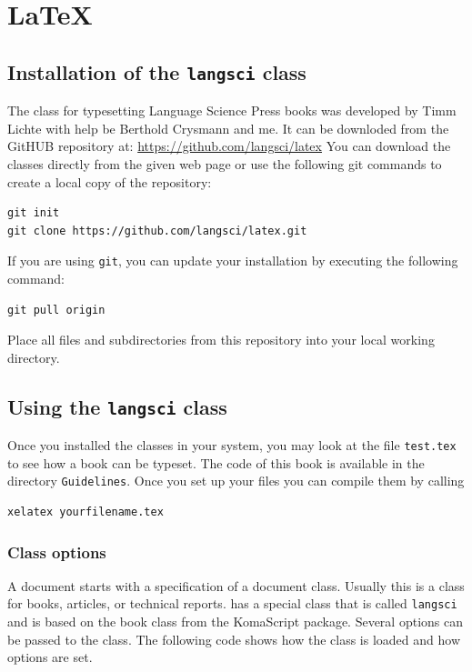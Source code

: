 \chapter{\LaTeX}

\section{Installation of the \texttt{langsci} class}

The \latex class for typesetting Language Science Press books was developed by Timm
Lichte with
help be Berthold Crysmann and me. It can be downloded from the GitHUB repository at: \url{https://github.com/langsci/latex}
You can download the classes directly from the given web page or use the following git commands to
create a local copy of the repository:
\begin{verbatim}
git init
git clone https://github.com/langsci/latex.git 
\end{verbatim}
If you are using \texttt{git}, you can update your installation by executing the following command:
\begin{verbatim}
git pull origin
\end{verbatim}

Place all files and subdirectories from this repository into your local working directory.

\section{Using the \texttt{langsci} class}

Once you installed the classes in your system, you may look at the file \texttt{test.tex} to see how
a book can be typeset. The code of this book is available in the directory \texttt{Guidelines}. Once
you set up your \latex files you can compile them by calling 
\begin{verbatim}
xelatex yourfilename.tex
\end{verbatim}



\subsection{Class options}

A \latex document starts with a specification of a document class. Usually this is a class for
books, articles, or technical reports. \lsp has a special class that is called \texttt{langsci} and is
based on the book class from the KomaScript package. Several options can be passed to the class. The
following code shows how the class is loaded and how options are set. 


